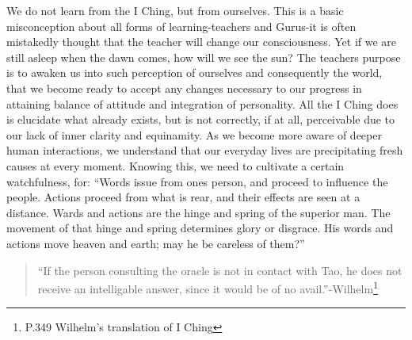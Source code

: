 \documentclass[11pt]{book}
\begin{document}
We do not learn from the I Ching, but from ourselves. This is a basic misconception about all forms of learning-teachers and Gurus-it is often mistakedly thought that the teacher will change our consciousness. Yet if we are still asleep when the dawn comes, how will we see the sun? The teachers purpose is to awaken us into such perception of ourselves and consequently the world, that we become ready to accept any changes necessary to our progress in attaining balance of attitude and integration of personality. All the I Ching does is elucidate what already exists, but is not correctly, if at all, perceivable due to our lack of inner clarity and equinamity. As we become more aware of deeper human interactions, we understand that our everyday lives are precipitating fresh causes at every moment. Knowing this, we need to cultivate a certain watchfulness, for: ``Words issue from ones person, and proceed to influence the people. Actions proceed from what is rear, and their effects are seen at a distance. Wards and actions are the hinge and spring of the superior man. The movement of that hinge and spring determines glory or disgrace. His words and actions move heaven and earth; may he be careless of them?''

\begin{quote}
  ``If the person consulting the oracle is not in contact with Tao, he does not receive an intelligable answer, since it would be of no avail.''-Wilhelm\footnote{P.349 Wilhelm's translation of I Ching}
\end{quote}
\end{document}
